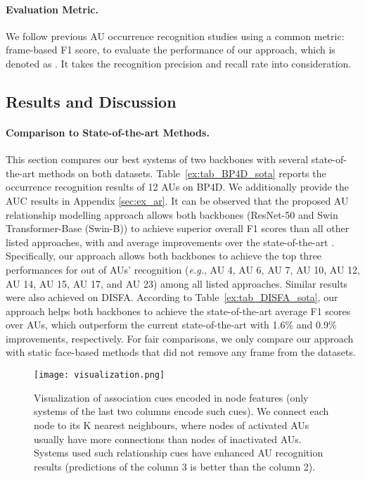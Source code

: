 \documentclass{article}
\begin{document}
\paragraph{Evaluation Metric.} We follow previous AU occurrence recognition studies \cite{shao2021jaa,churamani2021aula,li2019self,Song_2021_CVPR} using a common metric: frame-based F1 score, to evaluate the performance of our approach, which is denoted as . It takes the recognition precision  and recall rate  into consideration.






\subsection{Results and Discussion}
\label{subsec:results}





\paragraph{Comparison to State-of-the-art Methods.} This section compares our best systems of two backbones with several state-of-the-art methods on both datasets. Table~\ref{ex:tab_BP4D_sota} reports the occurrence recognition results of 12 AUs on BP4D. We additionally provide the AUC results in Appendix \ref{sec:ex_ar}. It can be observed that the proposed AU relationship modelling approach allows both backbones (ResNet-50 and Swin Transformer-Base (Swin-B)) to achieve superior overall F1 scores than all other listed approaches, with  and  average improvements over the state-of-the-art \cite{jacob2021facial}. Specifically, our approach allows both backbones to achieve the top three performances for  out of  AUs' recognition (\emph{e.g.}, AU 4, AU 6, AU 7, AU 10, AU 12, AU 14, AU 15, AU 17, and AU 23) among all listed approaches. Similar results were also achieved on DISFA. According to Table~\ref{ex:tab_DISFA_sota}, our approach helps both backbones to achieve the state-of-the-art average F1 scores over  AUs, which outperform the current state-of-the-art with 1.6\% and 0.9\% improvements, respectively. For fair comparisons, we only compare our approach with static face-based methods that did not remove any frame from the datasets.  



\begin{figure}[t]
  \centering
  \texttt{[image: visualization.png]}
  \caption{Visualization of association cues encoded in node features (only systems of the last two columns encode such cues). We connect each node to its K nearest neighbours, where nodes of activated AUs usually have more connections than nodes of inactivated AUs. Systems used such relationship cues have enhanced AU recognition results (predictions of the column 3 is better than the column 2).}
\label{fig:ex_visualization}
\end{figure}
\end{document}
